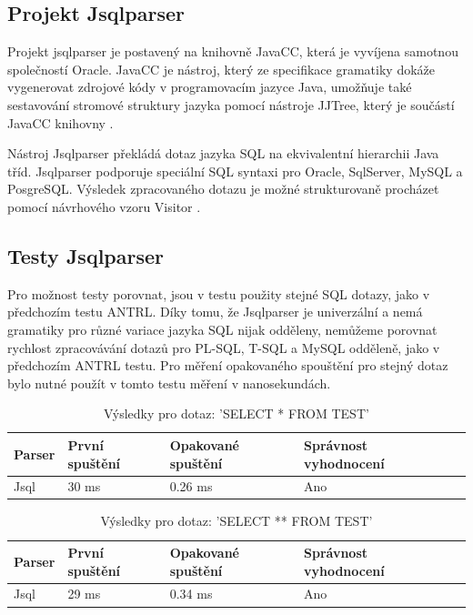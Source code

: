 \documentclass[czech,bachelor,public,dept460,male,cpdeclaration,twoside]{diploma}
\begin{document}
\subsection{Projekt Jsqlparser}
Projekt jsqlparser je postavený na knihovně JavaCC, která je vyvíjena samotnou společností Oracle. JavaCC je nástroj, který ze specifikace gramatiky dokáže vygenerovat zdrojové kódy v programovacím jazyce Java, umožňuje také sestavování stromové struktury jazyka pomocí nástroje JJTree, který je součástí JavaCC knihovny \cite{jsql}.


Nástroj Jsqlparser překládá dotaz jazyka SQL na ekvivalentní hierarchii Java tříd. Jsqlparser podporuje speciální SQL syntaxi pro Oracle, SqlServer, MySQL a PosgreSQL. Výsledek zpracovaného dotazu je možné strukturovaně procházet pomocí návrhového vzoru Visitor \cite{jsqld}.


\subsection{Testy Jsqlparser}
Pro možnost testy porovnat, jsou v testu použity stejné SQL dotazy, jako v předchozím testu ANTRL. Díky tomu, že Jsqlparser je univerzální a nemá gramatiky pro různé variace jazyka SQL nijak odděleny, nemůžeme porovnat rychlost zpracovávání dotazů pro PL-SQL, T-SQL a MySQL odděleně, jako v předchozím ANTRL testu. Pro měření opakovaného spouštění pro stejný dotaz bylo nutné použít v tomto testu měření v nanosekundách.

\begin{table}[!htbp]
	\centering
	\caption{Výsledky pro dotaz: 'SELECT * FROM TEST'}
	\label{tab:jsql1}
	\begin{tabular}{lllll}
		\toprule
		Parser & První spuštění & Opakované spuštění & Správnost vyhodnocení\\
		\midrule
		Jsql & 30 ms & 0.26 ms & Ano \\
		\midrule
	\end{tabular}
\end{table}

\begin{table}[!htbp]
	\centering
	\caption{Výsledky pro dotaz: 'SELECT ** FROM TEST'}
	\label{tab:jsql2}
	\begin{tabular}{lllll}
		\toprule
		Parser & První spuštění & Opakované spuštění & Správnost vyhodnocení\\
		\midrule
		Jsql & 29 ms & 0.34 ms & Ano \\
		\midrule
	\end{tabular}
\end{table}
\end{document}
